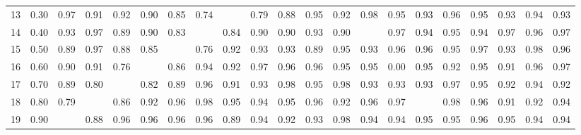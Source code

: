 \begin{table}[ht]
\begin{tabular}{rrrrrrrrrrrrrrrrrrrrr}
  13 & 0.30 & 0.97 & 0.91 & 0.92 & 0.90 & 0.85 & 0.74 &  & 0.79 & 0.88 & 0.95 & 0.92 & 0.98 & 0.95 & 0.93 & 0.96 & 0.95 & 0.93 & 0.94 & 0.93 \\ 
  14 & 0.40 & 0.93 & 0.97 & 0.89 & 0.90 & 0.83 &  & 0.84 & 0.90 & 0.90 & 0.93 & 0.90 &  & 0.97 & 0.94 & 0.95 & 0.94 & 0.97 & 0.96 & 0.97 \\ 
  15 & 0.50 & 0.89 & 0.97 & 0.88 & 0.85 &  & 0.76 & 0.92 & 0.93 & 0.93 & 0.89 & 0.95 & 0.93 & 0.96 & 0.96 & 0.95 & 0.97 & 0.93 & 0.98 & 0.96 \\ 
  16 & 0.60 & 0.90 & 0.91 & 0.76 &  & 0.86 & 0.94 & 0.92 & 0.97 & 0.96 & 0.96 & 0.95 & 0.95 & 0.00 & 0.95 & 0.92 & 0.95 & 0.91 & 0.96 & 0.97 \\ 
  17 & 0.70 & 0.89 & 0.80 &  & 0.82 & 0.89 & 0.96 & 0.91 & 0.93 & 0.98 & 0.95 & 0.98 & 0.93 & 0.93 & 0.93 & 0.97 & 0.95 & 0.92 & 0.94 & 0.92 \\ 
  18 & 0.80 & 0.79 &  & 0.86 & 0.92 & 0.96 & 0.98 & 0.95 & 0.94 & 0.95 & 0.96 & 0.92 & 0.96 & 0.97 &  & 0.98 & 0.96 & 0.91 & 0.92 & 0.94 \\ 
  19 & 0.90 &  & 0.88 & 0.96 & 0.96 & 0.96 & 0.96 & 0.89 & 0.94 & 0.92 & 0.93 & 0.98 & 0.94 & 0.94 & 0.95 & 0.95 & 0.96 & 0.95 & 0.94 & 0.94 \\ 
   \hline
\end{tabular}
\end{table}
